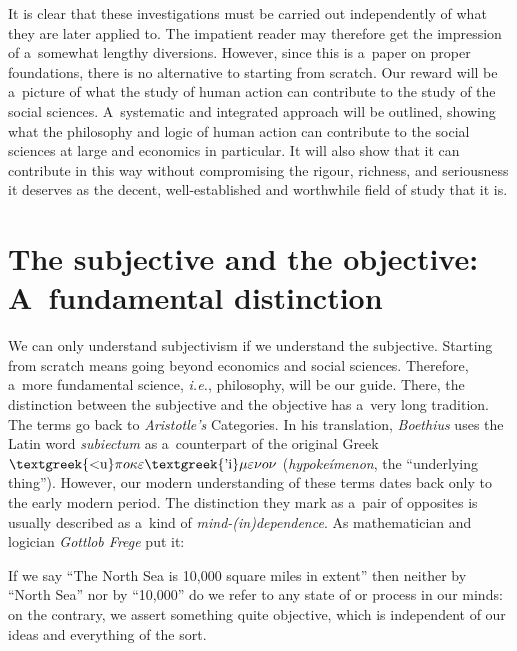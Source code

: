 It is clear that these investigations must be carried out independently of what they are later applied to. The impatient reader may therefore get the impression of a~somewhat lengthy diversions. However, since this is a~paper on proper foundations, there is no alternative to starting from scratch. Our reward will be a~picture of what the study of human action can contribute to the study of the social sciences. A~systematic and integrated approach will be outlined, showing what the philosophy and logic of human action can contribute to the social sciences at large and economics in particular. It will also show that it can contribute in this way without compromising the rigour, richness, and seriousness it deserves as the decent, well-established and worthwhile field of study that it is.



\section{The subjective and the objective: A~fundamental distinction}


We can only understand subjectivism if we understand the subjective. Starting from scratch means going beyond economics and social sciences. Therefore, a~more fundamental science, \textit{i.e.}, philosophy, will be our guide. There, the distinction between the subjective and the objective has a~very long tradition. The terms go back to \textit{Aristotle's} Categories. In his translation, \textit{Boethius} 
\parencites[cf.][]{}[][]{aristotle_categories_1938} %
 uses the Latin word \textit{subiectum} as a~counterpart of the original Greek \textit{$\text{\textgreek{<u}}\pi o\kappa \varepsilon \text{\textgreek{'i}}\mu \varepsilon \nu o\nu $} (\textit{hypokeímenon}, the ``underlying thing''). However, our modern understanding of these terms dates back only to the early modern period. The distinction they mark as a~pair of opposites is usually described as a~kind of \textit{mind-(in)dependence}. As mathematician and logician \textit{Gottlob Frege} put it:



If we say ``The North Sea is 10,000 square miles in extent'' then neither by ``North Sea'' nor by ``10,000'' do we refer to any state of or process in our minds: on the contrary, we assert something quite objective, which is independent of our ideas and everything of the sort. 
\parencite[][p.34]{frege_foundations_1953}%




